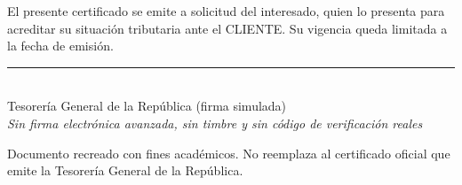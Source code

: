 \documentclass[carta,final]{lafrox}
\begin{document}
\noindent El presente certificado se emite a solicitud del interesado, quien lo presenta para acreditar su situación tributaria ante el CLIENTE. Su vigencia queda limitada a la fecha de emisión.

\vspace{24pt}
\begin{center}
  \rule{6.4cm}{0.5pt}\\[2pt]
  Tesorería General de la República (firma simulada)\\
  {\small\textit{Sin firma electrónica avanzada, sin timbre y sin código de verificación reales}}
\end{center}

\noindent\small Documento recreado con fines académicos. No reemplaza al certificado oficial que emite la Tesorería General de la República.
\end{document}
